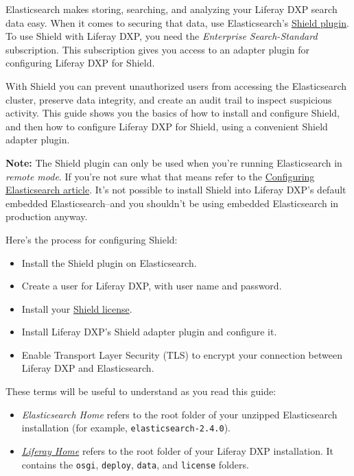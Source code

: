 Elasticsearch makes storing, searching, and analyzing your Liferay DXP
search data easy. When it comes to securing that data, use
Elasticsearch's
\href{https://www.elastic.co/guide/en/shield/2.4/index.html}{Shield
plugin}. To use Shield with Liferay DXP, you need the \emph{Enterprise
Search-Standard} subscription. This subscription gives you access to an
adapter plugin for configuring Liferay DXP for Shield.

With Shield you can prevent unauthorized users from accessing the
Elasticsearch cluster, preserve data integrity, and create an audit
trail to inspect suspicious activity. This guide shows you the basics of
how to install and configure Shield, and then how to configure Liferay
DXP for Shield, using a convenient Shield adapter plugin.

\noindent\hrulefill

\textbf{Note:} The Shield plugin can only be used when you're running
Elasticsearch in \emph{remote mode}. If you're not sure what that means
refer to the
\href{/docs/7-0/deploy/-/knowledge_base/d/configuring-elasticsearch-for-liferay-0}{Configuring
Elasticsearch article}. It's not possible to install Shield into Liferay
DXP's default embedded Elasticsearch--and you shouldn't be using
embedded Elasticsearch in production anyway.

\noindent\hrulefill

Here's the process for configuring Shield:

\begin{itemize}
\tightlist
\item
  Install the Shield plugin on Elasticsearch.
\item
  Create a user for Liferay DXP, with user name and password.
\item
  Install your
  \href{https://www.elastic.co/guide/en/shield/current/license-management.html}{Shield
  license}.
\item
  Install Liferay DXP's Shield adapter plugin and configure it.
\item
  Enable Transport Layer Security (TLS) to encrypt your connection
  between Liferay DXP and Elasticsearch.
\end{itemize}

These terms will be useful to understand as you read this guide:

\begin{itemize}
\tightlist
\item
  \emph{Elasticsearch Home} refers to the root folder of your unzipped
  Elasticsearch installation (for example,
  \texttt{elasticsearch-2.4.0}).
\item
  \href{/docs/7-0/deploy/-/knowledge_base/d/installing-product\#liferay-home}{\emph{Liferay
  Home}} refers to the root folder of your Liferay DXP installation. It
  contains the \texttt{osgi}, \texttt{deploy}, \texttt{data}, and
  \texttt{license} folders.
\end{itemize}

